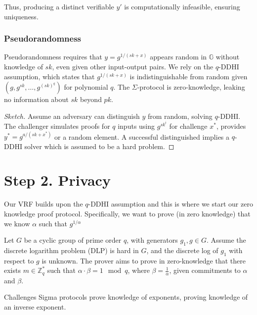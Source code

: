 Thus, producing a distinct verifiable $y'$ is computationally infeasible, ensuring uniqueness.

\subsubsection{Pseudorandomness}

Pseudorandomness requires that $y = g^{1/(sk + x)}$ appears random in $\mathbb{G}$ without knowledge of $sk$, even given other input-output pairs. We rely on the $q$-DDHI assumption, which states that $g^{1/(sk + x)}$ is indistinguishable from random given $(g, g^{sk}, \ldots, g^{(sk)^q})$ for polynomial $q$. 
The $\Sigma$-protocol is zero-knowledge, leaking no information about $sk$ beyond $pk$.

\begin{proof}[Sketch]
    Assume an adversary can distinguish $y$ from random, solving $q$-DDHI. The challenger simulates proofs for $q$ inputs using $g^{sk^i}$ for challenge $x^*$, provides $y^* = g^{a/(sk + x^*)}$ or a random element. A successful distinguished implies a $q$-DDHI solver which is assumed to be a hard problem.
\end{proof}


















\section{Step 2. Privacy}
Our VRF builds upon the $q$-DDHI assumption and this is where we start our zero knowledge proof protocol. Specifically, we want to prove (in zero knowledge) that we know $\alpha$ such that $g^{1/\alpha}$ 

Let $G$ be a cyclic group of prime order $q$, with generators $g_1, g \in G$. Assume the discrete logarithm problem (DLP) is hard in $G$, and the discrete log of $g_1$ with respect to $g$ is unknown.
The prover aims to prove in zero-knowledge that there exists $m \in \mathbb{Z}_q^*$ such that $\alpha \cdot \beta = 1 \mod q$, where $\beta = \frac{1}{\alpha}$, given commitments to $\alpha$ and $\beta$.

Challenges
Sigma protocols prove knowledge of exponents, proving knowledge of an inverse exponent. 


